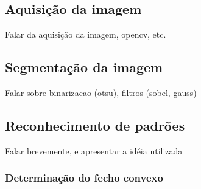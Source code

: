 \documentclass[12pt]{article}
\begin{document}
\subsection{Aquisição da imagem}
Falar da aquisição da imagem, opencv, etc.

\subsection{Segmentação da imagem}
Falar sobre binarizacao (otsu), filtros (sobel, gauss)

\subsection{Reconhecimento de padrões}
Falar brevemente, e apresentar a idéia utilizada

\subsubsection{Determinação do fecho convexo}
\end{document}
